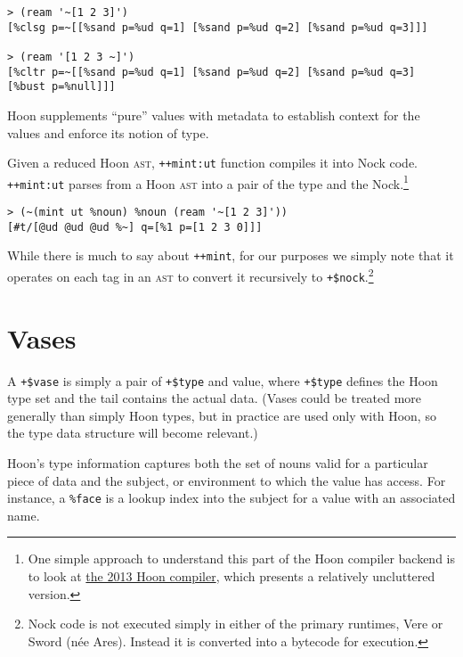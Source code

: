 \documentclass[twoside]{article}
\begin{document}
\begin{lstlisting}[style=listingcode]
> (ream '~[1 2 3]')
[%clsg p=~[[%sand p=%ud q=1] [%sand p=%ud q=2] [%sand p=%ud q=3]]]

> (ream '[1 2 3 ~]')
[%cltr p=~[[%sand p=%ud q=1] [%sand p=%ud q=2] [%sand p=%ud q=3] [%bust p=%null]]]
\end{lstlisting}

\noindent
Hoon supplements “pure” values with metadata to establish context for the values and enforce its notion of type.

Given a reduced Hoon \textsc{ast}, \lstinline[style=inlinecode]{++mint:ut} function compiles it into Nock code.  \lstinline[style=inlinecode]{++mint:ut} parses from a Hoon \textsc{ast} into a pair of the type and the Nock.\footnote{One simple approach to understand this part of the Hoon compiler backend is to look at \href{https://github.com/urbit/archaeology/blob/6b2ce202207b9bb3f4e65fc1ea9a2fb434396dd4/urb/zod/arvo/hoon.hoon#L7698}{the 2013 Hoon compiler}, which presents a relatively uncluttered version.}

\begin{lstlisting}[style=listingcode]
> (~(mint ut %noun) %noun (ream '~[1 2 3]'))
[#t/[@ud @ud @ud %~] q=[%1 p=[1 2 3 0]]]
\end{lstlisting}

\noindent
While there is much to say about \lstinline[style=inlinecode]{++mint}, for our purposes we simply note that it operates on each tag in an \textsc{ast} to convert it recursively to \lstinline[style=inlinecode]{+$nock}.\footnote{Nock code is not executed simply in either of the primary runtimes, Vere or Sword (née Ares).  Instead it is converted into a bytecode for execution.}

\section{Vases}

A \lstinline[style=inlinecode]{+$vase} is simply a pair of \lstinline[style=inlinecode]{+$type} and value, where \lstinline[style=inlinecode]{+$type} defines the Hoon type set and the tail contains the actual data.  (Vases could be treated more generally than simply Hoon types, but in practice are used only with Hoon, so the type data structure will become relevant.)


Hoon's type information captures both the set of nouns valid for a particular piece of data and the subject, or environment to which the value has access.  For instance, a \lstinline[style=inlinecode]{%face} is a lookup index into the subject for a value with an associated name.
\end{document}
